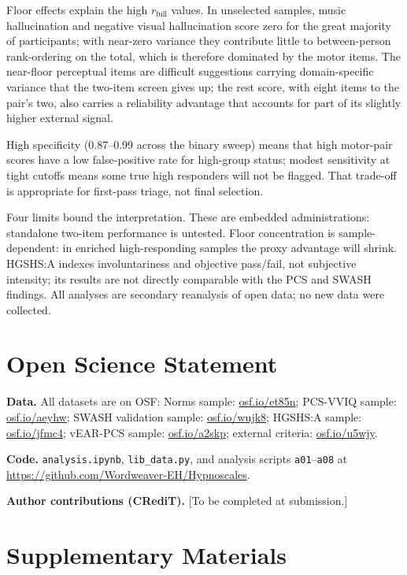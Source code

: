 \documentclass[12pt,a4paper]{article}
\begin{document}
Floor effects explain the high $r_{\text{full}}$ values. In unselected
samples, music hallucination and negative visual hallucination score zero
for the great majority of participants; with near-zero variance they
contribute little to between-person rank-ordering on the total, which is
therefore dominated by the motor items. The near-floor perceptual items are
difficult suggestions carrying domain-specific variance that the two-item
screen gives up; the rest score, with eight items to the pair's two, also
carries a reliability advantage that accounts for part of its slightly
higher external signal.

High specificity (0.87--0.99 across the binary sweep) means that high
motor-pair scores have a low false-positive rate for high-group status; modest
sensitivity at tight cutoffs means some true high responders will not be
flagged. That trade-off is appropriate for first-pass triage, not final
selection.

Four limits bound the interpretation. These are embedded administrations:
standalone two-item performance is untested. Floor concentration is
sample-dependent: in enriched high-responding samples the proxy advantage
will shrink. HGSHS:A indexes involuntariness and objective pass/fail, not
subjective intensity; its results are not directly comparable with the PCS
and SWASH findings. All analyses are secondary reanalysis of open data; no
new data were collected.


\section*{Open Science Statement}

\textbf{Data.} All datasets are on OSF:
Norms sample: \url{osf.io/et85n};
PCS-VVIQ sample: \url{osf.io/aeyhw};
SWASH validation sample: \url{osf.io/wujk8};
HGSHS:A sample: \url{osf.io/jfmc4};
vEAR-PCS sample: \url{osf.io/a2skp};
external criteria: \url{osf.io/u5wjy}.

\textbf{Code.} \texttt{analysis.ipynb}, \texttt{lib\_data.py}, and
analysis scripts \texttt{a01}--\texttt{a08} at
\url{https://github.com/Wordweaver-EH/Hypnoscales}.

\textbf{Author contributions (CRediT).} [To be completed at submission.]

\clearpage
\section*{Supplementary Materials}
\end{document}

